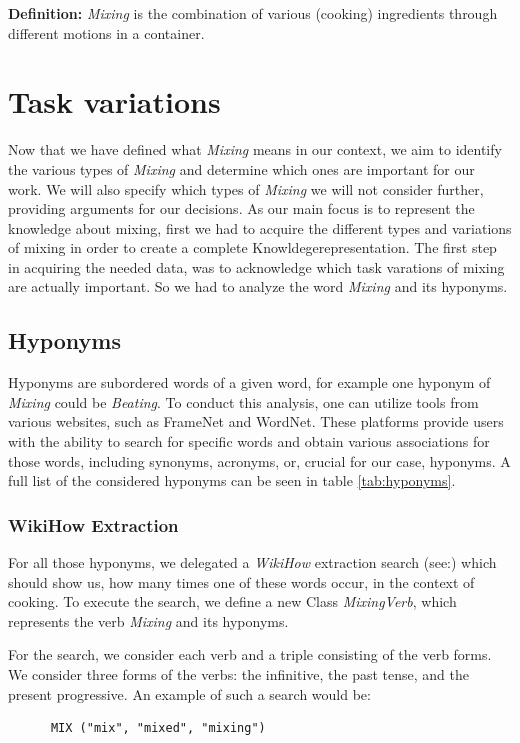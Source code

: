   \textbf{Definition:} \textit{Mixing} is the combination of various (cooking) ingredients through different motions in a container.
  

\section{Task variations}
Now that we have defined what \textit{Mixing} means in our context, we aim to identify the various types of \textit{Mixing} and determine which ones are important for our work. We will also specify which types of \textit{Mixing} we will not consider further, providing arguments for our decisions.
	As our main focus is to represent the knowledge about mixing, first we had to acquire the different types and variations of mixing in order to create a complete Knowldegerepresentation. The first step in acquiring the needed data, was to acknowledge which task varations of mixing are actually important. 
  So we had to analyze the word \textit{Mixing} and its hyponyms. 
\subsection{Hyponyms} 
	Hyponyms are subordered words of a given word, for example one hyponym of \textit{Mixing} could be \textit{Beating}\cite{oxford_hyponym}.
  To conduct this analysis, one can utilize tools from various websites, such as FrameNet\cite{FrameNet} and WordNet\cite{WordNet}. These platforms provide users with the ability to search for specific words and obtain various associations for those words, including synonyms, acronyms, or, crucial for our case, hyponyms.	
  A full list of the considered hyponyms can be seen in table \ref{tab:hyponyms}.
\subsubsection{WikiHow Extraction}
  For all those hyponyms, we delegated a \textit{WikiHow} extraction search (see:) which should show us, how many times one of these words occur, in the context of cooking.
	To execute the search, we define a new Class \textit{MixingVerb}, which represents the verb \textit{Mixing} and its hyponyms.
  
  For the search, we consider each verb and a triple consisting of the verb forms. We consider three forms of the verbs: the infinitive, the past tense, and the present progressive. An example of such a search would be:
  \begin{lstlisting}
      MIX ("mix", "mixed", "mixing")
  \end{lstlisting}

